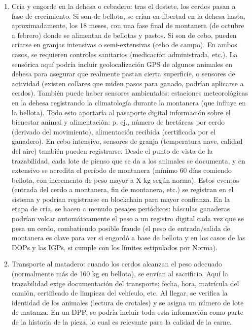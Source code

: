 \begin{enumerate}
    \item Cría y engorde en la dehesa o cebadero: tras el destete, los cerdos pasan a fase de crecimiento. Si son de bellota, se crían en libertad en la dehesa hasta, aproximadamente, los 18 meses, con una fase final de montanera (de octubre a febrero) donde se alimentan de bellotas y pastos. Si son de cebo, pueden criarse en granjas intensivas o semi-extensivas (cebo de campo). En ambos casos, se requieren controles sanitarios (medicación administrada, etc.). La sensórica aquí podría incluir geolocalización GPS de algunos animales en dehesa para asegurar que realmente pastan cierta superficie, o sensores de actividad (existen collares que miden pasos para ganado, podrían aplicarse a cerdos). También puede haber sensores ambientales: estaciones meteorológicas en la dehesa registrando la climatología durante la montanera (que influye en la bellota). Todo esto aportaría al pasaporte digital información sobre el bienestar animal y alimentación: p. ej., número de hectáreas por cerdo (derivado del movimiento), alimentación recibida (certificada por el ganadero). En cebo intensivo, sensores de granja (temperatura nave, calidad del aire) también pueden registrarse. Desde el punto de vista de la trazabilidad, cada lote de pienso que se da a los animales se documenta, y en extensivo se acredita el período de montanera (mínimo 60 días comiendo bellota, con incremento de peso mayor a X kg según norma). Estos eventos (entrada del cerdo a montanera, fin de montanera, etc.) se registran en el sistema y podrían registrarse en blockchain para mayor confianza. En la etapa de cría, se hacen a menudo pesajes periódicos: básculas ganaderas podrían volcar automáticamente el peso a un registro digital cada vez que se pesa un cerdo, combatiendo posible fraude (el peso de entrada/salida de montanera es clave para ver si engordó a base de bellota y en los casos de las DOPs y las IGPs, si cumple con los límites estipulados por Norma).
    \item Transporte al matadero: cuando los cerdos alcanzan el peso adecuado (normalmente  más de 160 kg en bellota), se envían al sacrificio. Aquí la trazabilidad exige documentación del transporte: fecha, hora, matrícula del camión, certificado de limpieza del vehículo, etc. Al llegar, se verifica la identidad de los animales (lectura de crotales) y se asigna un número de lote de matanza. En un DPP, se podría incluir toda esta información como parte de la historia de la pieza, lo cual es relevante para la calidad de la carne.

\end{enumerate}
